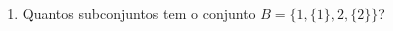 \documentclass[a4paper,14pt]{article}
\begin{document}
\begin{multicols}{2}
\begin{enumerate}
			\item Quantos subconjuntos tem o conjunto $B = \{1, \{1\}, 2, \{2\}\}$? \\\\\\\\\\\\\\\\\\\\
		\end{enumerate}
		$~$ \\ $~$ \\ $~$ \\ $~$ \\ $~$ \\ $~$ \\ $~$ \\ $~$ \\ $~$ \\ $~$ \\ $~$ \\ $~$ \\ $~$ \\ $~$ \\ $~$ \\ $~$ \\ $~$ \\ $~$ \\ $~$ \\ $~$ \\ $~$ \\ $~$ \\ $~$ \\ $~$ \\ $~$ \\ $~$ \\ $~$ \\ $~$ \\ $~$ \\ $~$ \\ $~$ \\ $~$ \\ $~$ \\ $~$ \\ $~$ \\ $~$ \\ 
	\end{multicols}
\end{document}
